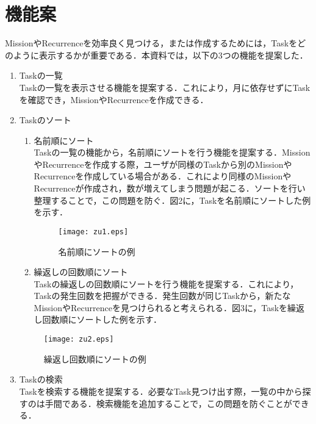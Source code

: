 \documentclass[fleqn, 14pt]{extarticlej}
\begin{document}

\section{機能案}
MissionやRecurrenceを効率良く見つける，または作成するためには，Taskをどのように表示するかが重要である．本資料では，以下の3つの機能を提案した．\\
\begin{enumerate}
	\item Taskの一覧\\
	Taskの一覧を表示させる機能を提案する．これにより，月に依存せずにTaskを確認でき，MissionやRecurrenceを作成できる．
	\item Taskのソート
	\begin{enumerate}
		\item 名前順にソート\\
		Taskの一覧の機能から，名前順にソートを行う機能を提案する．MissionやRecurrenceを作成する際，ユーザが同様のTaskから別のMissionやRecurrenceを作成している場合がある．これにより同様のMissionやRecurrenceが作成され，数が増えてしまう問題が起こる．ソートを行い整理することで，この問題を防ぐ．図2に，Taskを名前順にソートした例を示す．
	
\begin{figure}[h]
  \begin{center}
    \texttt{[image: zu1.eps]}
    \caption{名前順にソートの例}
  \end{center}
\end{figure}
	
		\item 繰返しの回数順にソート\\
			Taskの繰返しの回数順にソートを行う機能を提案する．これにより，Taskの発生回数を把握ができる．発生回数が同じTaskから，新たなMissionやRecurrenceを見つけられると考えられる．図3に，Taskを繰返し回数順にソートした例を示す．
	\end{enumerate}
	
\begin{figure}[h]
  \begin{center}
    \texttt{[image: zu2.eps]}
    \caption{繰返し回数順にソートの例}
  \end{center}
\end{figure}
	
	\item Taskの検索\\
	Taskを検索する機能を提案する．必要なTask見つけ出す際，一覧の中から探すのは手間である．検索機能を追加することで，この問題を防ぐことができる．
	
\end{enumerate}
\end{document}
